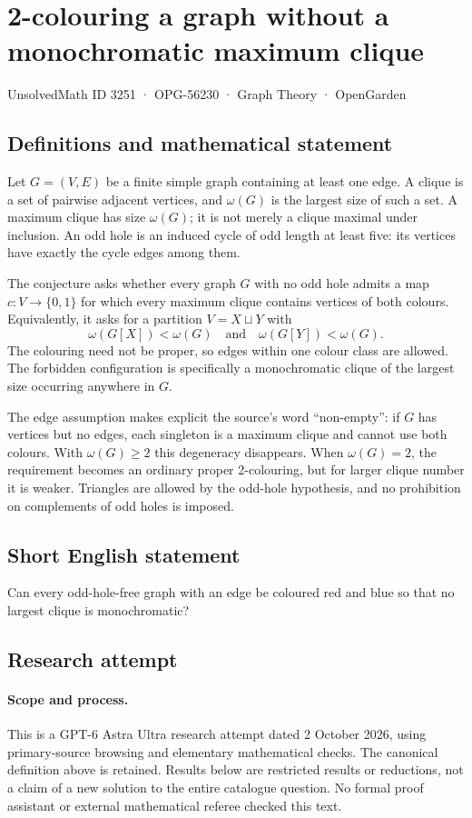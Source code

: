 \documentclass[11pt,a4paper]{article}
\begin{document}
\section*{2-colouring a graph without a monochromatic maximum clique}\label{3251}
{\small UnsolvedMath ID 3251 · OPG-56230 · Graph Theory · OpenGarden}
\subsection{Definitions and mathematical statement}
Let $G=(V,E)$ be a finite simple graph containing at least one edge. A
clique is a set of pairwise adjacent vertices, and $\omega(G)$ is the
largest size of such a set. A maximum clique has size $\omega(G)$; it is
not merely a clique maximal under inclusion. An odd hole is an induced
cycle of odd length at least five: its vertices have exactly the cycle
edges among them.

The conjecture asks whether every graph $G$ with no odd hole admits a
map $c:V\to\{0,1\}$ for which every maximum clique contains vertices of
both colours. Equivalently, it asks for a partition $V=X\sqcup Y$ with
\[
                 \omega(G[X])<\omega(G)
                 \quad\text{and}\quad
                 \omega(G[Y])<\omega(G).
\]
The colouring need not be proper, so edges within one colour class are
allowed. The forbidden configuration is specifically a monochromatic
clique of the largest size occurring anywhere in $G$.

The edge assumption makes explicit the source's word ``non-empty'': if
$G$ has vertices but no edges, each singleton is a maximum clique and
cannot use both colours. With $\omega(G)\ge2$ this degeneracy disappears.
When $\omega(G)=2$, the requirement becomes an ordinary proper
2-colouring, but for larger clique number it is weaker. Triangles are
allowed by the odd-hole hypothesis, and no prohibition on complements
of odd holes is imposed.
\subsection{Short English statement}
Can every odd-hole-free graph with an edge be coloured red and blue so that no largest clique is monochromatic?
\subsection{Research attempt}
\paragraph{Scope and process.}
This is a GPT-6 Astra Ultra research attempt dated 2 October 2026, using
primary-source browsing and elementary mathematical checks. The canonical
definition above is retained. Results below are restricted results or
reductions, not a claim of a new solution to the entire catalogue question.
No formal proof assistant or external mathematical referee checked this text.
\end{document}
